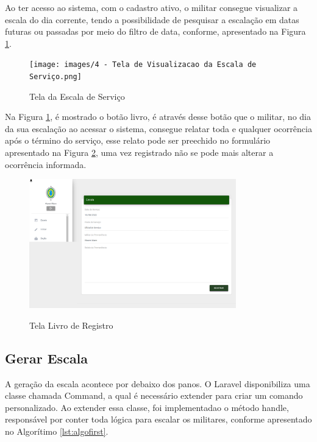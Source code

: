 Ao ter acesso ao sistema, com o cadastro ativo, o militar consegue visualizar a escala do dia corrente, tendo a possibilidade de pesquisar a escalação em datas futuras ou passadas por meio do filtro de data, conforme, apresentado na Figura \ref{fig:escalaservico}.

\begin{figure}[!htb]
    \centering
    \caption{Tela da Escala de Serviço}
    \texttt{[image: images/4 - Tela de Visualizacao da Escala de Serviço.png]}
    \label{fig:escalaservico}
\end{figure}

Na Figura \ref{fig:escalaservico}, é mostrado o botão livro, é através desse botão que o militar, no dia da sua escalação ao acessar o sistema, consegue relatar toda e qualquer ocorrência após o término do serviço, esse relato pode ser preechido no formulário apresentado na Figura \ref{fig:livroregistro}, uma vez registrado não se pode mais alterar a ocorrência informada.

\begin{figure}[!htb]
    \centering
    \caption{Tela Livro de Registro}
    \includegraphics[width=0.8\textwidth]{images/5 - Tela Livo de Registro.png}
    \label{fig:livroregistro}
\end{figure}


\subsection{Gerar Escala}

A geração da escala acontece por debaixo dos panos. O Laravel disponibiliza uma classe chamada Command, a qual é necessário extender para criar um comando personalizado. Ao extender essa classe, foi implementadao o método handle, responsável por conter toda lógica para escalar os militares,  conforme apresentado no Algorítimo \ref{lst:algofirst}.

